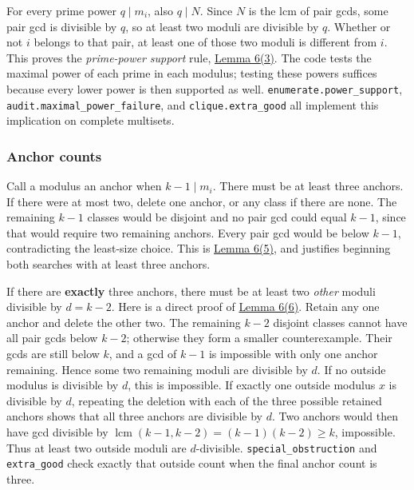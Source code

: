 \documentclass[11pt,a4paper]{article}
\begin{document}
For every prime power \(q\mid m_i\), also \(q\mid N\). Since \(N\) is the lcm of pair gcds, some pair gcd is divisible by \(q\), so at least two moduli are divisible by \(q\). Whether or not \(i\) belongs to that pair, at least one of those two moduli is different from \(i\). This proves the \emph{prime-power support} rule, \href{https://arxiv.org/pdf/math/0604347v2}{Lemma 6(3)}. The code tests the maximal power of each prime in each modulus; testing these powers suffices because every lower power is then supported as well. \texttt{enumerate.power\_support}, \texttt{audit.maximal\_power\_failure}, and \texttt{clique.extra\_good} all implement this implication on complete multisets.

\subsubsection{Anchor counts}\label{anchor-counts}

Call a modulus an anchor when \(k-1\mid m_i\). There must be at least three anchors. If there were at most two, delete one anchor, or any class if there are none. The remaining \(k-1\) classes would be disjoint and no pair gcd could equal \(k-1\), since that would require two remaining anchors. Every pair gcd would be below \(k-1\), contradicting the least-size choice. This is \href{https://arxiv.org/pdf/math/0604347v2}{Lemma 6(5)}, and justifies beginning both searches with at least three anchors.

If there are \textbf{exactly} three anchors, there must be at least two \emph{other} moduli divisible by \(d=k-2\). Here is a direct proof of \href{https://arxiv.org/pdf/math/0604347v2}{Lemma 6(6)}. Retain any one anchor and delete the other two. The remaining \(k-2\) disjoint classes cannot have all pair gcds below \(k-2\); otherwise they form a smaller counterexample. Their gcds are still below \(k\), and a gcd of \(k-1\) is impossible with only one anchor remaining. Hence some two remaining moduli are divisible by \(d\). If no outside modulus is divisible by \(d\), this is impossible. If exactly one outside modulus \(x\) is divisible by \(d\), repeating the deletion with each of the three possible retained anchors shows that all three anchors are divisible by \(d\). Two anchors would then have gcd divisible by \(\operatorname{lcm}(k-1,k-2)=(k-1)(k-2)\ge k\), impossible. Thus at least two outside moduli are \(d\)-divisible. \texttt{special\_obstruction} and \texttt{extra\_good} check exactly that outside count when the final anchor count is three.
\end{document}
